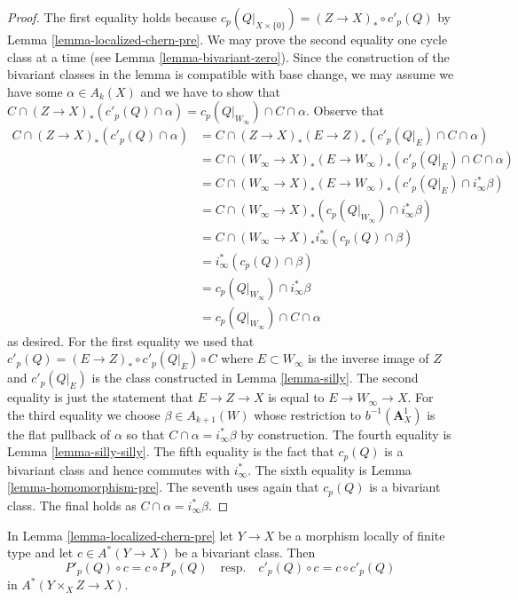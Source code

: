 \begin{proof}
The first equality holds because $c_p(Q|_{X \times \{0\}}) =
(Z \to X)_* \circ c'_p(Q)$ by Lemma \ref{lemma-localized-chern-pre}.
We may prove the second equality one cycle class at a time
(see Lemma \ref{lemma-bivariant-zero}). Since the construction of
the bivariant classes in the lemma is compatible with base change,
we may assume we have some $\alpha \in A_k(X)$ and we have to show that
$C \cap (Z \to X)_*(c'_p(Q) \cap \alpha) =
c_p(Q|_{W_\infty}) \cap C \cap \alpha$. Observe that
\begin{align*}
C \cap (Z \to X)_*(c'_p(Q) \cap \alpha)
& =
C \cap (Z \to X)_* (E \to Z)_*(c'_p(Q|_E) \cap C \cap \alpha) \\
& =
C \cap (W_\infty \to X)_*(E \to W_\infty)_*(c'_p(Q|_E) \cap C \cap \alpha) \\
& =
C \cap (W_\infty \to X)_*(E \to W_\infty)_*(c'_p(Q|_E) \cap i_\infty^*\beta) \\
& =
C \cap (W_\infty \to X)_*(c_p(Q|_{W_\infty}) \cap i_\infty^*\beta) \\
& =
C \cap (W_\infty \to X)_*i_\infty^*(c_p(Q) \cap \beta) \\
& =
i_\infty^*(c_p(Q) \cap \beta) \\
& =
c_p(Q|_{W_\infty}) \cap i_\infty^*\beta \\
& =
c_p(Q|_{W_\infty}) \cap C \cap \alpha
\end{align*}
as desired. For the first equality we used that
$c'_p(Q) = (E \to Z)_* \circ c'_p(Q|_E) \circ C$ where $E \subset W_\infty$
is the inverse image of $Z$ and $c'_p(Q|_E)$ is the class constructed
in Lemma \ref{lemma-silly}. The second equality is just the statement
that $E \to Z \to X$ is equal to $E \to W_\infty \to X$.
For the third equality we choose $\beta \in A_{k + 1}(W)$ whose restriction to
$b^{-1}(\mathbf{A}^1_X)$ is the flat pullback of $\alpha$ so that
$C \cap \alpha = i_\infty^*\beta$ by construction. The fourth equality is
Lemma \ref{lemma-silly-silly}. The fifth equality is the fact that
$c_p(Q)$ is a bivariant class and hence commutes with $i_\infty^*$.
The sixth equality is Lemma \ref{lemma-homomorphism-pre}.
The seventh uses again that $c_p(Q)$ is a bivariant class.
The final holds as $C \cap \alpha = i_\infty^*\beta$.
\end{proof}

\begin{lemma}
\label{lemma-homomorphism-commute}
In Lemma \ref{lemma-localized-chern-pre} let $Y \to X$ be a morphism
locally of finite type and let $c \in A^*(Y \to X)$ be a bivariant class.
Then
$$
P'_p(Q) \circ c = c \circ P'_p(Q)
\quad\text{resp.}\quad
c'_p(Q) \circ c = c \circ c'_p(Q)
$$
in $A^*(Y \times_X Z \to X)$.
\end{lemma}

